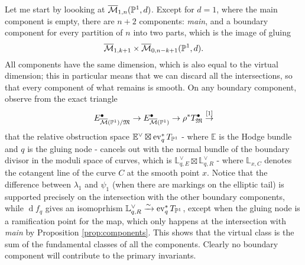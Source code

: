 Let me start by loooking at $\overline{\mathcal{M}}_{1,n}(\mathbb P^1,d)$. Except for $d=1$, where the main component is empty, there are $n+2$ components: \emph{main}, and a boundary component for every partition of $n$ into two parts, which is the image of gluing \[\overline{\mathcal{M}}_{1,k+1}\times\overline{\mathcal{M}}_{0,n-k+1}(\mathbb P^1,d).\]
All components have the same dimension, which is also equal to the virtual dimension; this in particular means that we can discard all the intersections, so that every component of what remains is smooth. On any boundary component, observe from the exact triangle
\[ E^\bullet_{\overline{\mathcal{M}}(\mathbb P^1)/\mathfrak M}\rightarrow E^\bullet_{\overline{\mathcal{M}}(\mathbb P^1)}\rightarrow \rho^*T^\bullet_{\mathfrak M}\overset{[1]}{\rightarrow}\]
that the relative obstruction space $\mathbb E^\vee\boxtimes \operatorname{ev}_q^*T_{\mathbb P^1}$ - where $\mathbb E$ is the Hodge bundle and $q$ is the gluing node - cancels out with the normal bundle of the boundary divisor in the moduli space of curves, which is $\mathbb L_{q,E}^\vee\boxtimes \mathbb L_{q,R}^\vee$ - where $\mathbb L_{x,C}$ denotes the cotangent line of the curve $C$ at the smooth point $x$. Notice that the difference between $\lambda_1$ and $\psi_1$ (when there are markings on the elliptic tail) is supported precisely on the intersection with the other boundary components, while $\operatorname{d}\!f_q$ gives an isomoprhism $\mathbb L_{q,R}^\vee\xrightarrow{\sim}\operatorname{ev}_q^*T_{\mathbb P^1}$, except when the gluing node is a ramification point for the map, which only happens at the intersection with \emph{main} by Proposition \ref{prop:components}. This shows that the virtual class is the sum of the fundamental classes of all the components. Clearly no boundary component will contribute to the primary invariants.

